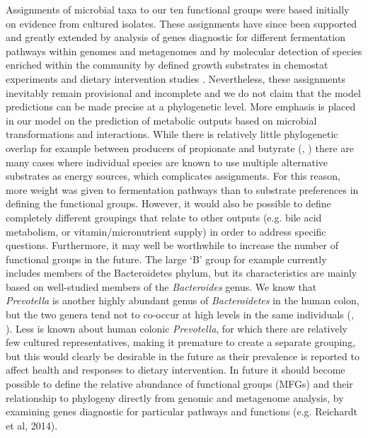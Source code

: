 \documentclass[a4paper]{article}
\begin{document}
Assignments of microbial taxa to our ten functional groups were based initially on evidence from cultured isolates. These assignments have since been supported and greatly extended by analysis of genes diagnostic for different fermentation pathways within genomes and metagenomes \citep{reichardt} and by molecular detection of species enriched within the community by defined growth substrates in chemostat experiments \citep{duncan16} and dietary intervention studies \citep{salonen}. Nevertheless, these assignments inevitably remain provisional and incomplete and we do not claim that the model predictions can be made precise at a phylogenetic level. More emphasis is placed in our model on the prediction of metabolic outputs based on microbial transformations and interactions. While there is relatively little phylogenetic overlap for example between producers of propionate and butyrate (\cite{reichardt}, \cite{louis17}) there are many cases where individual species are known to use multiple alternative substrates as energy sources, which complicates assignments. For this reason, more weight was given to fermentation pathways than to substrate preferences in defining the functional groups.  
However, it would also be possible to define completely different groupings that relate to other outputs (e.g. bile acid metabolism, or vitamin/micronutrient supply) in order to address specific questions.
Furthermore, it may well be worthwhile to increase the number of functional groups in the future. The large ‘B’ group for example currently includes members of the Bacteroidetes phylum, but its characteristics are mainly based on well-studied members of the \textit{Bacteroides} genus. We know that \textit{Prevotella} is another highly abundant genus of \textit{Bacteroidetes} in the human colon, but the two genera tend not to co-occur at high levels in the same individuals (\cite{wu}, \cite{chung}). Less is known about human colonic \textit{Prevotella}, for which there are relatively few cultured representatives, making it premature to create a separate grouping, but this would clearly be desirable in the future as their prevalence is reported to affect health and responses to dietary intervention.
In future it should become possible to define the relative abundance of functional groups (MFGs) and their relationship to phylogeny directly from genomic and metagenome analysis, by examining genes diagnostic for particular pathways and functions (e.g. Reichardt et al, 2014).
\end{document}
